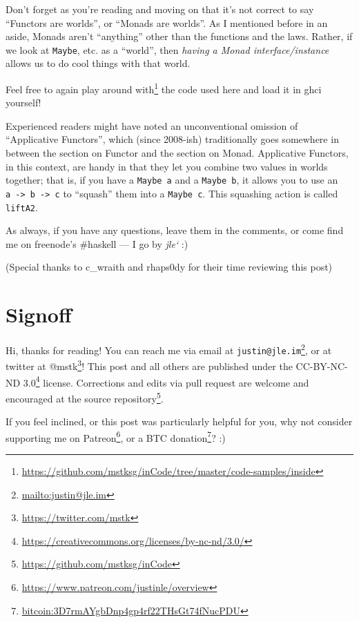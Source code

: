 \documentclass[]{article}
\renewcommand{\href}[2]{#2\footnote{\url{#1}}}
\begin{document}
Don't forget as you're reading and moving on that it's not correct to say
``Functors are worlds'', or ``Monads are worlds''. As I mentioned before in an
aside, Monads aren't ``anything'' other than the functions and the laws. Rather,
if we look at \texttt{Maybe}, etc. as a ``world'', then \emph{having a Monad
interface/instance} allows us to do cool things with that world.

Feel free to again
\href{https://github.com/mstksg/inCode/tree/master/code-samples/inside}{play
around with} the code used here and load it in ghci yourself!

Experienced readers might have noted an unconventional omission of ``Applicative
Functors'', which (since 2008-ish) traditionally goes somewhere in between the
section on Functor and the section on Monad. Applicative Functors, in this
context, are handy in that they let you combine two values in worlds together;
that is, if you have a \texttt{Maybe\ a} and a \texttt{Maybe\ b}, it allows you
to use an \texttt{a\ -\textgreater{}\ b\ -\textgreater{}\ c} to ``squash'' them
into a \texttt{Maybe\ c}. This squashing action is called \texttt{liftA2}.

As always, if you have any questions, leave them in the comments, or come find
me on freenode's \#haskell --- I go by \emph{jle`} :)

(Special thanks to c\_wraith and rhaps0dy for their time reviewing this post)

\section{Signoff}\label{signoff}

Hi, thanks for reading! You can reach me via email at
\href{mailto:justin@jle.im}{\nolinkurl{justin@jle.im}}, or at twitter at
\href{https://twitter.com/mstk}{@mstk}! This post and all others are published
under the \href{https://creativecommons.org/licenses/by-nc-nd/3.0/}{CC-BY-NC-ND
3.0} license. Corrections and edits via pull request are welcome and encouraged
at \href{https://github.com/mstksg/inCode}{the source repository}.

If you feel inclined, or this post was particularly helpful for you, why not
consider \href{https://www.patreon.com/justinle/overview}{supporting me on
Patreon}, or a \href{bitcoin:3D7rmAYgbDnp4gp4rf22THsGt74fNucPDU}{BTC donation}?
:)
\end{document}
